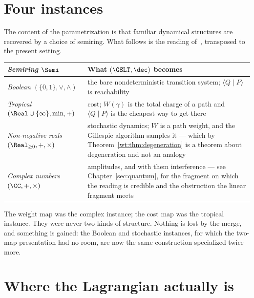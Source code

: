 \section{Four instances}

The content of the parametrization is that familiar dynamical structures
are recovered by a choice of semiring.  What follows is the reading
of~\cite[\S13]{CE}, transposed to the present setting.

\begin{center}
\renewcommand{\arraystretch}{1.35}
\begin{tabular}{>{\itshape}p{4.3cm} p{7.4cm}}
\toprule
\normalfont\textbf{Semiring $\Semi$} & \textbf{What $(\GSLT,\dec)$ becomes} \\
\midrule
Boolean $(\{0,1\},\vee,\wedge)$
  & the bare nondeterministic transition system; $\langle Q\mid P\rangle$
    is reachability \\
Tropical $(\Real\cup\{\infty\},\min,+)$
  & cost; $W(\gamma)$ is the total charge of a path and
    $\langle Q\mid P\rangle$ is the cheapest way to get there \\
Non-negative reals $(\Real_{\geq 0},+,\times)$
  & stochastic dynamics; $W$ is a path weight, and the Gillespie
    algorithm samples it --- which by
    Theorem~\ref{wt:thm:degeneration} is a theorem about degeneration
    and not an analogy \\
Complex numbers $(\CC,+,\times)$
  & amplitudes, and with them interference --- see
    Chapter~\ref{sec:quantum}, for the fragment on which the reading is
    credible and the obstruction the linear fragment meets \\
\bottomrule
\end{tabular}
\end{center}

\begin{remark}
The weight map was the complex instance; the cost map was the tropical
instance.  They were never two kinds of structure.  Nothing is lost by
the merge, and something is gained: the Boolean and stochastic instances,
for which the two-map presentation had no room, are now the same
construction specialized twice more.
\end{remark}

\section{Where the Lagrangian actually is}

